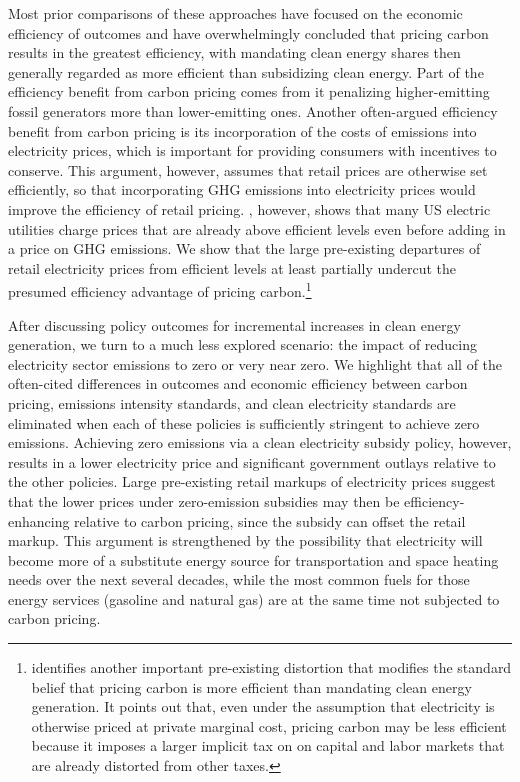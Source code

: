 \documentclass[12pt]{article}
\begin{document}
Most prior comparisons of these approaches have focused on the economic efficiency of outcomes and have overwhelmingly concluded that pricing carbon results in the greatest efficiency, with mandating clean energy shares then generally regarded as more efficient than subsidizing clean energy. Part of the efficiency benefit from carbon pricing comes from it penalizing higher-emitting fossil generators more than lower-emitting ones. Another often-argued efficiency benefit from carbon pricing is its incorporation of the costs of emissions into electricity prices, which is important for providing consumers with incentives to conserve. This argument, however, assumes that retail prices are otherwise set efficiently, so that incorporating GHG emissions into electricity prices would improve the efficiency of retail pricing.  \cite{borenstein2022dotwo}, however, shows that many US electric utilities charge prices that are already above efficient levels even before adding in a price on GHG emissions.  We show that the large pre-existing departures of retail electricity prices from efficient levels at least partially undercut the presumed efficiency advantage of pricing carbon.\footnote{\cite{goulder2016general} identifies another important pre-existing distortion that modifies the standard belief that pricing carbon is more efficient than mandating clean energy generation. It points out that, even under the assumption that electricity is otherwise priced at private marginal cost, pricing carbon may be less efficient because it imposes a larger implicit tax on on capital and labor markets that are already distorted from other taxes.}

After discussing policy outcomes for incremental increases in clean energy generation, we turn to a much less explored scenario: the impact of reducing electricity sector emissions to zero or very near zero. We highlight that all of the often-cited differences in outcomes and economic efficiency between carbon pricing, emissions intensity standards, and clean electricity standards are eliminated when each of these policies is sufficiently stringent to achieve zero emissions. Achieving zero emissions via a clean electricity subsidy policy, however, results in a lower electricity price and significant government outlays relative to the other policies. Large pre-existing retail markups of electricity prices suggest that the lower prices under zero-emission subsidies may then be efficiency-enhancing relative to carbon pricing, since the subsidy can offset the retail markup. This argument is strengthened by the possibility that electricity will become more of a substitute energy source for transportation and space heating needs over the next several decades, while the most common fuels for those energy services (gasoline and natural gas) are at the same time not subjected to carbon pricing.
\end{document}
